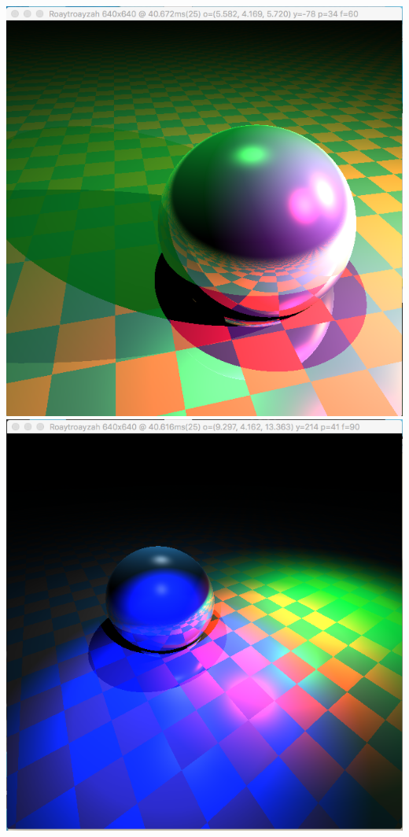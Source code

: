 \includegraphics[width=\textwidth]{img/colPointlights1sphere_close}
\includegraphics[width=\textwidth]{img/colSpotlights1sphere}

